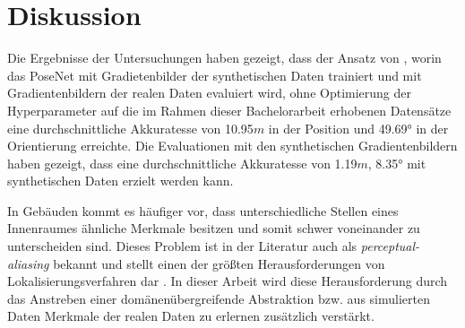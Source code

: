 
\section{Diskussion}
\label{sec:kapitel_5}





Die Ergebnisse der Untersuchungen haben gezeigt, dass der Ansatz von \citet{acharyaBIMPoseNetIndoorCamera2019}, worin das PoseNet mit Gradietenbilder der synthetischen Daten trainiert und mit Gradientenbildern der realen Daten evaluiert wird, ohne Optimierung der Hyperparameter auf die im Rahmen dieser Bachelorarbeit erhobenen Datensätze eine durchschnittliche Akkuratesse von 10.95$m$ in der Position und 49.69° in der Orientierung erreichte. Die Evaluationen mit den synthetischen Gradientenbildern haben gezeigt, dass eine durchschnittliche Akkuratesse von 1.19$m$, 8.35° mit synthetischen Daten erzielt werden kann. 



In Gebäuden kommt es häufiger vor, dass unterschiedliche Stellen eines Innenraumes ähnliche Merkmale besitzen und somit schwer voneinander zu unterscheiden sind. Dieses Problem ist in der Literatur auch als \textit{perceptual-aliasing} bekannt und stellt einen der größten Herausforderungen von Lokalisierungsverfahren dar \cite{lowryVisualPlaceRecognition2016}. In dieser Arbeit wird diese Herausforderung durch das Anstreben einer domänenübergreifende Abstraktion bzw. aus simulierten Daten Merkmale der realen Daten zu erlernen zusätzlich verstärkt.



